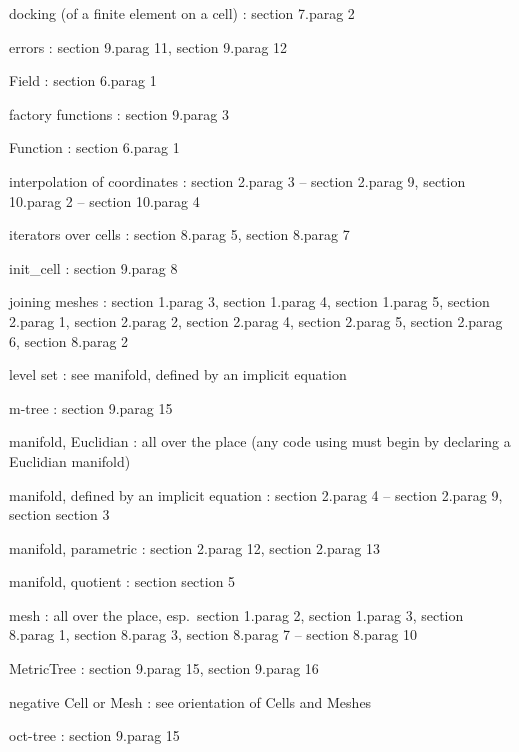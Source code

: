 {docking (of a finite element on a cell) : \numb section 7.\numb parag 2

errors : \numb section 9.\numb parag 11, \numb section 9.\numb parag 12

{\codett Field} : \numb section 6.\numb parag 1

factory functions : \numb section 9.\numb parag 3

{\codett Function} : \numb section 6.\numb parag 1

interpolation of coordinates : \numb section 2.\numb parag 3 -- \numb section 2.\numb parag 9,
\numb section 10.\numb parag 2 -- \numb section 10.\numb parag 4

iterators over cells : \numb section 8.\numb parag 5, \numb section 8.\numb parag 7

{\codett init\_cell} : \numb section 9.\numb parag 8

{\codett join}ing meshes : \numb section 1.\numb parag 3, \numb section 1.\numb parag 4,
\numb section 1.\numb parag 5, \numb section 2.\numb parag 1, \numb section 2.\numb parag 2,
\numb section 2.\numb parag 4, \numb section 2.\numb parag 5, \numb section 2.\numb parag 6,
\numb section 8.\numb parag 2

level set : see manifold, defined by an implicit equation

m-tree : \numb section 9.\numb parag 15

manifold, Euclidian : all over the place\hfil\break
\hglue 15mm (any code using {\maniFEM} must begin by declaring a Euclidian manifold)

manifold, defined by an implicit equation : \numb section 2.\numb parag 4 --
\numb section 2.\numb parag 9, section \numb section 3

manifold, parametric : \numb section 2.\numb parag 12, \numb section 2.\numb parag 13

manifold, quotient : section \numb section 5

mesh : all over the place, esp.\ \numb section 1.\numb parag 2, \numb section 1.\numb parag 3,
\numb section 8.\numb parag 1, \numb section 8.\numb parag 3, \numb section 8.\numb parag 7
-- \numb section 8.\numb parag 10

{\codett MetricTree} : \numb section 9.\numb parag 15, \numb section 9.\numb parag 16

negative {\codett Cell} or {\codett Mesh} : see orientation of {\codett Cell}s and
{\codett Mesh}es

oct-tree : \numb section 9.\numb parag 15

}
